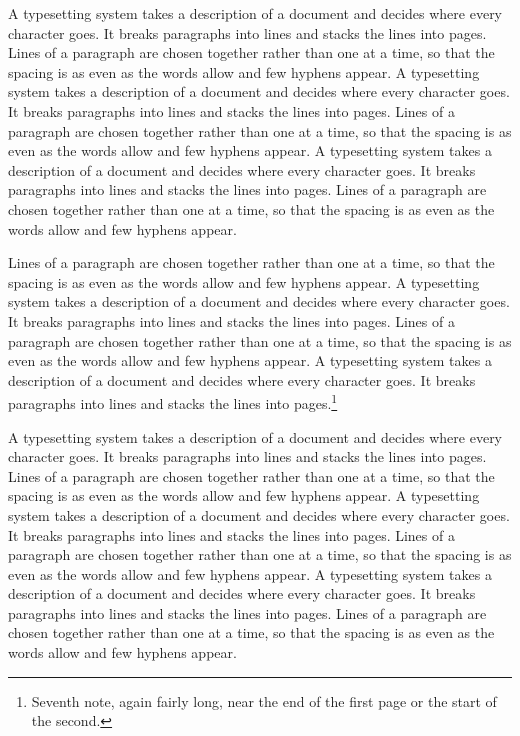 \documentclass{article}
\begin{document}
A typesetting system takes a description of a document and decides where every character goes. It breaks paragraphs into lines and stacks the lines into pages. Lines of a paragraph are chosen together rather than one at a time, so that the spacing is as even as the words allow and few hyphens appear. A typesetting system takes a description of a document and decides where every character goes. It breaks paragraphs into lines and stacks the lines into pages. Lines of a paragraph are chosen together rather than one at a time, so that the spacing is as even as the words allow and few hyphens appear. A typesetting system takes a description of a document and decides where every character goes. It breaks paragraphs into lines and stacks the lines into pages. Lines of a paragraph are chosen together rather than one at a time, so that the spacing is as even as the words allow and few hyphens appear.

Lines of a paragraph are chosen together rather than one at a time, so that the spacing is as even as the words allow and few hyphens appear. A typesetting system takes a description of a document and decides where every character goes. It breaks paragraphs into lines and stacks the lines into pages. Lines of a paragraph are chosen together rather than one at a time, so that the spacing is as even as the words allow and few hyphens appear. A typesetting system takes a description of a document and decides where every character goes. It breaks paragraphs into lines and stacks the lines into pages.\footnote{Seventh note, again fairly long, near the end of the first page or the start of the second.}

A typesetting system takes a description of a document and decides where every character goes. It breaks paragraphs into lines and stacks the lines into pages. Lines of a paragraph are chosen together rather than one at a time, so that the spacing is as even as the words allow and few hyphens appear. A typesetting system takes a description of a document and decides where every character goes. It breaks paragraphs into lines and stacks the lines into pages. Lines of a paragraph are chosen together rather than one at a time, so that the spacing is as even as the words allow and few hyphens appear. A typesetting system takes a description of a document and decides where every character goes. It breaks paragraphs into lines and stacks the lines into pages. Lines of a paragraph are chosen together rather than one at a time, so that the spacing is as even as the words allow and few hyphens appear.
\end{document}
